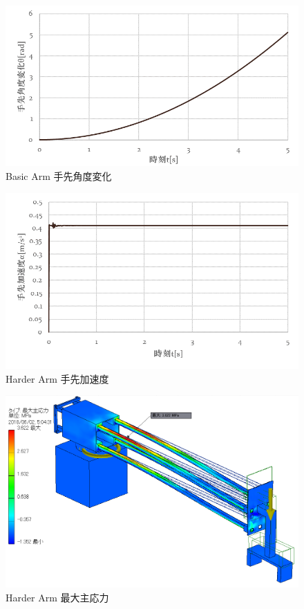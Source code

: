 \documentclass[10pt,b5paper,papersize,dvipdfmx]{jsbook}
\begin{document}
\null\vfill %
\begin{figure}[H]
  \centering
  \includegraphics[width=.8\textwidth]{img/robot16.png}
  \caption{Basic Arm 手先角度変化}
  \label{fig:Basic Arm 手先角度変化}
\end{figure}
%
\begin{figure}[H]
  \centering
  \includegraphics[width=.8\textwidth]{img/robot17.png}
  \caption{Harder Arm 手先加速度}
  \label{fig:Harder Arm 手先加速度}
\end{figure}
\vfill\null %
%
\begin{figure}[H]
  \centering
  \includegraphics[width=.65\textwidth]{img/robot18.png}
  \caption{Harder Arm 最大主応力}
  \label{fig:Harder Arm 最大主応力}
\end{figure}
\end{document}
